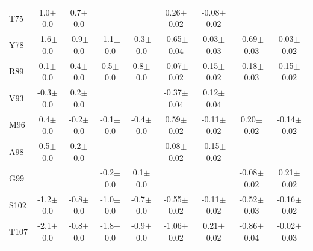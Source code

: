 \documentclass[%
 aip,
 amsmath,amssymb,
 preprint,%
]{revtex4-1}
\begin{document}
\begin{center}
\begin{longtable}{l|c|c|c|c|c|c|c|c}
T75 & 1.0$\pm$0.0 & 0.7$\pm$0.0 & & & 0.26$\pm$0.02 & -0.08$\pm$0.02 & & \\
Y78 & -1.6$\pm$0.0 & -0.9$\pm$0.0 & -1.1$\pm$0.0 & -0.3$\pm$0.0 & -0.65$\pm$0.04 & 0.03$\pm$0.03 & -0.69$\pm$0.03 & 0.03$\pm$0.02 \\
R89 & 0.1$\pm$0.0 & 0.4$\pm$0.0 & 0.5$\pm$0.0 & 0.8$\pm$0.0 & -0.07$\pm$0.02 & 0.15$\pm$0.02 & -0.18$\pm$0.03 & 0.15$\pm$0.02 \\
V93 & -0.3$\pm$0.0 & 0.2$\pm$0.0 & & & -0.37$\pm$0.04 & 0.12$\pm$0.04 & & \\
M96 & 0.4$\pm$0.0 & -0.2$\pm$0.0 & -0.1$\pm$0.0 & -0.4$\pm$0.0 & 0.59$\pm$0.02 & -0.11$\pm$0.02 & 0.20$\pm$0.02 & -0.14$\pm$0.02 \\
A98 & 0.5$\pm$0.0 & 0.2$\pm$0.0 & & & 0.08$\pm$0.02 & -0.15$\pm$0.02 & & \\
G99 & & & -0.2$\pm$0.0 & 0.1$\pm$0.0 & & & -0.08$\pm$0.02 & 0.21$\pm$0.02 \\
S102 & -1.2$\pm$0.0 & -0.8$\pm$0.0 & -1.0$\pm$0.0 & -0.7$\pm$0.0 & -0.55$\pm$0.02 & -0.11$\pm$0.02 & -0.52$\pm$0.03 & -0.16$\pm$0.02 \\
T107 & -2.1$\pm$0.0 & -0.8$\pm$0.0 & -1.8$\pm$0.0 & -0.9$\pm$0.0 & -1.06$\pm$0.02 & 0.21$\pm$0.02 & -0.86$\pm$0.04 & -0.02$\pm$0.03 \\
\end{longtable}
\end{center}
\endgroup
\end{document}
